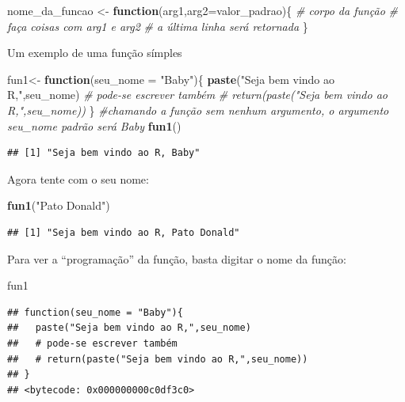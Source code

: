 \documentclass[
]{book}
\newenvironment{Shaded}{\begin{snugshade}}{\end{snugshade}}
\newcommand{\CommentTok}[1]{\textcolor[rgb]{0.56,0.35,0.01}{\textit{#1}}}
\newcommand{\ControlFlowTok}[1]{\textcolor[rgb]{0.13,0.29,0.53}{\textbf{#1}}}
\newcommand{\DataTypeTok}[1]{\textcolor[rgb]{0.13,0.29,0.53}{#1}}
\newcommand{\KeywordTok}[1]{\textcolor[rgb]{0.13,0.29,0.53}{\textbf{#1}}}
\newcommand{\NormalTok}[1]{#1}
\newcommand{\StringTok}[1]{\textcolor[rgb]{0.31,0.60,0.02}{#1}}
\theoremstyle{definition}
\theoremstyle{definition}
\theoremstyle{definition}
\theoremstyle{remark}
\begin{document}
\begin{Shaded}
\begin{Highlighting}[]
\NormalTok{nome_da_funcao <-}\StringTok{ }\ControlFlowTok{function}\NormalTok{(arg1,}\DataTypeTok{arg2=}\NormalTok{valor_padrao)\{}
  \CommentTok{# corpo da função}
  \CommentTok{# faça coisas com arg1 e arg2}
  \CommentTok{# a última linha será retornada}
\NormalTok{\}}
\end{Highlighting}
\end{Shaded}

Um exemplo de uma função símples

\begin{Shaded}
\begin{Highlighting}[]
\NormalTok{ fun1<-}\StringTok{ }\ControlFlowTok{function}\NormalTok{(}\DataTypeTok{seu_nome =} \StringTok{"Baby"}\NormalTok{)\{}
  \KeywordTok{paste}\NormalTok{(}\StringTok{"Seja bem vindo ao R,"}\NormalTok{,seu_nome)}
  \CommentTok{# pode-se escrever também}
  \CommentTok{# return(paste("Seja bem vindo ao R,",seu_nome))}
\NormalTok{\}}
\CommentTok{#chamando a função sem nenhum argumento, o argumento seu_nome padrão será Baby}
\KeywordTok{fun1}\NormalTok{()}
\end{Highlighting}
\end{Shaded}

\begin{verbatim}
## [1] "Seja bem vindo ao R, Baby"
\end{verbatim}

Agora tente com o seu nome:

\begin{Shaded}
\begin{Highlighting}[]
\KeywordTok{fun1}\NormalTok{(}\StringTok{"Pato Donald"}\NormalTok{)}
\end{Highlighting}
\end{Shaded}

\begin{verbatim}
## [1] "Seja bem vindo ao R, Pato Donald"
\end{verbatim}

Para ver a ``programação'' da função, basta digitar o nome da função:

\begin{Shaded}
\begin{Highlighting}[]
\NormalTok{fun1}
\end{Highlighting}
\end{Shaded}

\begin{verbatim}
## function(seu_nome = "Baby"){
##   paste("Seja bem vindo ao R,",seu_nome)
##   # pode-se escrever também
##   # return(paste("Seja bem vindo ao R,",seu_nome))
## }
## <bytecode: 0x000000000c0df3c0>
\end{verbatim}
\end{document}
